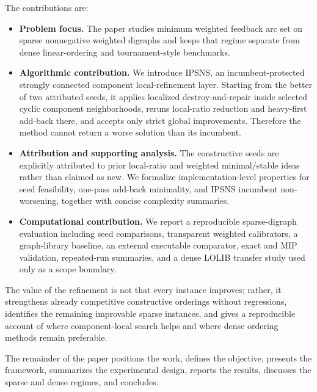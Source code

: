 The contributions are:
\begin{itemize}
    \item \textbf{Problem focus.} The paper studies minimum weighted feedback arc set on sparse nonnegative weighted digraphs and keeps that regime separate from dense linear-ordering and tournament-style benchmarks.
    \item \textbf{Algorithmic contribution.} We introduce IPSNS, an incumbent-protected strongly connected component local-refinement layer. Starting from the better of two attributed seeds, it applies localized destroy-and-repair inside selected cyclic component neighborhoods, reruns local-ratio reduction and heavy-first add-back there, and accepts only strict global improvements. Therefore the method cannot return a worse solution than its incumbent.
    \item \textbf{Attribution and supporting analysis.} The constructive seeds are explicitly attributed to prior local-ratio and weighted minimal/stable ideas rather than claimed as new. We formalize implementation-level properties for seed feasibility, one-pass add-back minimality, and IPSNS incumbent non-worsening, together with concise complexity summaries.
    \item \textbf{Computational contribution.} We report a reproducible sparse-digraph evaluation including seed comparisons, transparent weighted calibrators, a graph-library baseline, an external executable comparator, exact and MIP validation, repeated-run summaries, and a dense LOLIB transfer study used only as a scope boundary.
\end{itemize}

The value of the refinement is not that every instance improves; rather, it strengthens already competitive constructive orderings without regressions, identifies the remaining improvable sparse instances, and gives a reproducible account of where component-local search helps and where dense ordering methods remain preferable.

The remainder of the paper positions the work, defines the objective, presents the framework, summarizes the experimental design, reports the results, discusses the sparse and dense regimes, and concludes.
